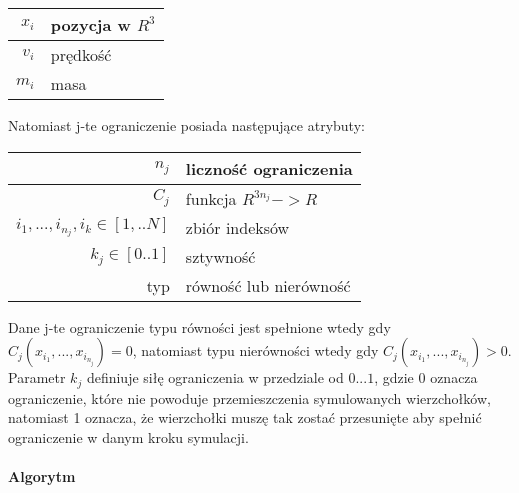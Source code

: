 \centering
\begin{tabular}{|r|l|}
\hline
$x_i$ & pozycja w $R^3$ \\
\hline
$v_i$ & prędkość \\
\hline
$m_i$ & masa\\
\hline
\end{tabular}

\raggedright
Natomiast j-te ograniczenie posiada następujące atrybuty:

\centering
\begin{tabular}{|r|l|}
\hline
$n_j$ & liczność ograniczenia \\
\hline
$C_j$ & funkcja $R^{3n_j} -> R$\\
\hline
${i_1, ..., i_{n_j}}, i_k \in [1,..N]$ & zbiór indeksów\\
\hline
$k_j \in [0.. 1]$ & sztywność\\
\hline
typ & równość lub nierówność\\
\hline
\end{tabular}

\raggedright
Dane j-te ograniczenie typu równości jest spełnione wtedy gdy $C_j(x_{i_1},...,
		x_{i_{n_j}}) = 0$, natomiast typu nierówności wtedy gdy $C_j(x_{i_1},...,
		x_{i_{n_j}}) > 0$. Parametr $k_j$ definiuje siłę ograniczenia w
		przedziale od $0...1$, gdzie 0 oznacza ograniczenie, które nie powoduje
		przemieszczenia symulowanych wierzchołków, natomiast 1 oznacza, że
		wierzchołki muszę tak zostać przesunięte aby spełnić ograniczenie w
		danym kroku symulacji.

\paragraph{Algorytm}

